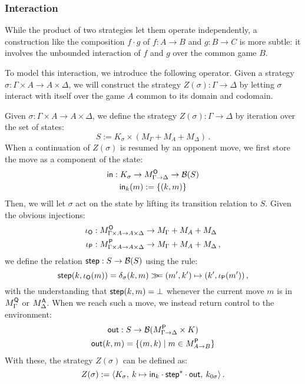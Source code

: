 
\subsubsection{Interaction} %

While the product of two strategies
let them operate independently,
a construction like the composition $f \cdot g$ of
$f : A \rightarrow B$ and $g : B \rightarrow C$
is more subtle:
it involves the unbounded interaction of $f$ and $g$
over the common game $B$.

To model this interaction,
we introduce the following operator.
Given a strategy $\sigma : \Gamma \times A \rightarrow A \times \Delta$,
we will construct the strategy $Z(\sigma) : \Gamma \rightarrow \Delta$
by letting $\sigma$ interact with itself
over the game $A$ common to its domain and codomain.

\begin{definition}
Given $\sigma : \Gamma \times A \rightarrow A \times \Delta$,
we define the strategy $Z(\sigma) : \Gamma \rightarrow \Delta$
by iteration over the set of states:
\[
    S := K_\sigma \times (M_\Gamma + M_A + M_\Delta) \,.
\]
When a continuation of $Z(\sigma)$ is resumed by an opponent move,
we first store the move as a component of the state:
\begin{gather*}
   \mathsf{in}  : K_\sigma \rightarrow
            M_{\Gamma \rightarrow \Delta}^{ \mathsf{O} } \rightarrow
            \mathcal{B}(S) \\
   \mathsf{in} _k(m) := \{ (k, m) \}
\end{gather*}
Then, we will let $\sigma$ act on the state
by lifting its transition relation to $S$.
Given the obvious injections:
\begin{align*}
  \iota_{ \mathsf{O} } &:
    M_{\Gamma \times A \rightarrow A \times \Delta}^{ \mathsf{O} }
    \rightarrow
    M_\Gamma + M_A + M_\Delta \\
  \iota_{ \mathsf{P} } &:
    M_{\Gamma \times A \rightarrow A \times \Delta}^{ \mathsf{P} }
    \rightarrow
    M_\Gamma + M_A + M_\Delta \,,
\end{align*}
we define the relation
$ \mathsf{step}  : S \rightarrow \mathcal{B}(S)$
using the rule:
\[
   \mathsf{step} (k, \iota_{ \mathsf{O} }(m)) =
    \delta_\sigma(k, m) \gg\!\!= (m', k') \mapsto (k', \iota_{ \mathsf{P} }(m')) \,,
\]
with the understanding that $ \mathsf{step} (k, m) = \bot$
whenever the current move $m$ is
in $M_\Gamma^{ \mathsf{Q} }$ or $M_\Delta^{ \mathsf{A} }$.
When we reach such a move,
we instead return control to the environment:
\begin{gather*}
   \mathsf{out}  : S \rightarrow
    \mathcal{B}(M_{\Gamma \rightarrow \Delta}^{ \mathsf{P} } \times K) \\
   \mathsf{out} (k, m) =
    \{ (m, k) \mid m \in M_{A \rightarrow B}^{ \mathsf{P} } \}
\end{gather*}
With these, the strategy $Z(\sigma)$ can be defined as:
\[
    Z(\sigma) := \langle
       K_\sigma, \:
       k \mapsto  \mathsf{in} _k \cdot  \mathsf{step} ^* \cdot  \mathsf{out} , \:
       k_{0\sigma}
     \rangle \,.
\]
\end{definition}

